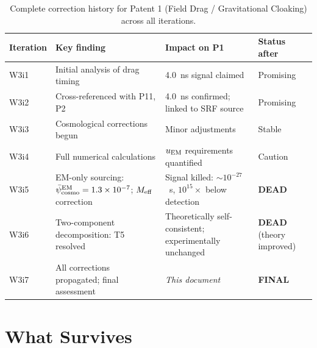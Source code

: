\documentclass[11pt]{article}
\newcommand{\Meff}{M_{\rm eff}}
\newcommand{\ee}[1]{\times 10^{#1}}
\newcommand{\psicosmo}{\bar{\psi}_{\rm cosmo}}
\theoremstyle{definition}
\theoremstyle{remark}
\begin{document}
\begin{table}[H]
\centering
\caption{Complete correction history for Patent 1 (Field Drag /
Gravitational Cloaking) across all iterations.}
\label{tab:P1_history}
\renewcommand{\arraystretch}{1.25}
\begin{tabular}{@{}p{1.8cm}p{4cm}p{4cm}p{3.5cm}@{}}
\toprule
\textbf{Iteration} & \textbf{Key finding} & \textbf{Impact on P1} &
  \textbf{Status after} \\
\midrule
W3i1 & Initial analysis of drag timing & 4.0~ns signal claimed &
  \textcolor{strongcolor}{Promising} \\
W3i2 & Cross-referenced with P11, P2 & 4.0~ns confirmed;
  linked to SRF source & \textcolor{strongcolor}{Promising} \\
W3i3 & Cosmological corrections begun & Minor adjustments &
  \textcolor{strongcolor}{Stable} \\
W3i4 & Full numerical calculations & $u_{\rm EM}$ requirements
  quantified & \textcolor{conjcolor}{Caution} \\
W3i5 & EM-only sourcing: $\psicosmo^{\rm EM} = 1.3\ee{-7}$;
  $\Meff$ correction & Signal killed: $\sim 10^{-27}$~s,
  $10^{15}\times$ below detection &
  \textcolor{falsified}{\textbf{DEAD}} \\
W3i6 & Two-component decomposition: T5 resolved &
  Theoretically self-consistent; experimentally unchanged &
  \textcolor{falsified}{\textbf{DEAD}} (theory improved) \\
W3i7 & All corrections propagated; final assessment &
  \emph{This document} &
  \textcolor{falsified}{\textbf{FINAL}} \\
\bottomrule
\end{tabular}
\end{table}

\section{What Survives}
\label{sec:P1_survives}
\end{document}
